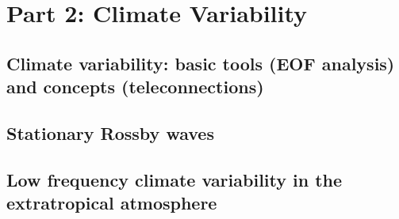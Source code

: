 \chapter{Part 2: Climate Variability}
\section{Climate variability: basic tools (EOF analysis) and concepts (teleconnections)}

\section{Stationary Rossby waves}

\section{Low frequency climate variability in the extratropical atmosphere}

